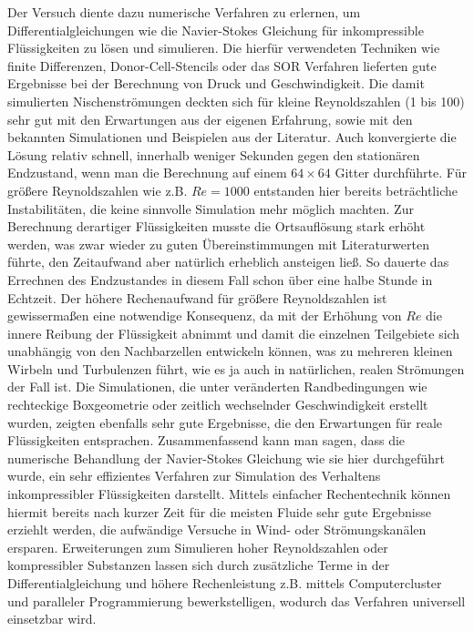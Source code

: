 	Der Versuch diente dazu numerische Verfahren zu erlernen, um Differentialgleichungen wie die Navier-Stokes Gleichung für inkompressible Flüssigkeiten zu lösen und simulieren.
	Die hierfür verwendeten Techniken wie finite Differenzen, Donor-Cell-Stencils oder das SOR Verfahren lieferten gute Ergebnisse bei der Berechnung von Druck und Geschwindigkeit.
	Die damit simulierten Nischenströmungen deckten sich für kleine Reynoldszahlen (1 bis 100) sehr gut mit den Erwartungen aus der eigenen Erfahrung, sowie mit den bekannten Simulationen und Beispielen aus der Literatur.
	Auch konvergierte die Lösung relativ schnell, innerhalb weniger Sekunden gegen den stationären Endzustand, wenn man die Berechnung auf einem $64\times64$ Gitter durchführte.
	Für größere Reynoldszahlen wie z.B. $Re = 1000$ entstanden hier bereits beträchtliche Instabilitäten, die keine sinnvolle Simulation mehr möglich machten.
	Zur Berechnung derartiger Flüssigkeiten musste die Ortsauflösung stark erhöht werden, was zwar wieder zu guten Übereinstimmungen mit Literaturwerten führte, den Zeitaufwand aber natürlich erheblich ansteigen ließ.
	So dauerte das Errechnen des Endzustandes in diesem Fall schon über eine halbe Stunde in Echtzeit.
	Der höhere Rechenaufwand für größere Reynoldszahlen ist gewissermaßen eine notwendige Konsequenz, da mit der Erhöhung von $Re$ die innere Reibung der Flüssigkeit abnimmt und damit die einzelnen Teilgebiete sich unabhängig von den Nachbarzellen entwickeln können, was zu mehreren kleinen Wirbeln und Turbulenzen führt, wie es ja auch in natürlichen, realen Strömungen der Fall ist.
	Die Simulationen, die unter veränderten Randbedingungen wie rechteckige Boxgeometrie oder zeitlich wechselnder Geschwindigkeit erstellt wurden, zeigten ebenfalls sehr gute Ergebnisse, die den Erwartungen für reale Flüssigkeiten entsprachen.
	Zusammenfassend kann man sagen, dass die numerische Behandlung der Navier-Stokes Gleichung wie sie hier durchgeführt wurde, ein sehr effizientes Verfahren zur Simulation des Verhaltens inkompressibler Flüssigkeiten darstellt.
	Mittels einfacher Rechentechnik können hiermit bereits nach kurzer Zeit für die meisten Fluide sehr gute Ergebnisse erziehlt werden, die aufwändige Versuche in Wind- oder Strömungskanälen ersparen.
	Erweiterungen zum Simulieren hoher Reynoldszahlen oder kompressibler Substanzen lassen sich durch zusätzliche Terme in der Differentialgleichung und höhere Rechenleistung z.B. mittels Computercluster und paralleler Programmierung bewerkstelligen, wodurch das Verfahren universell einsetzbar wird.


	 
